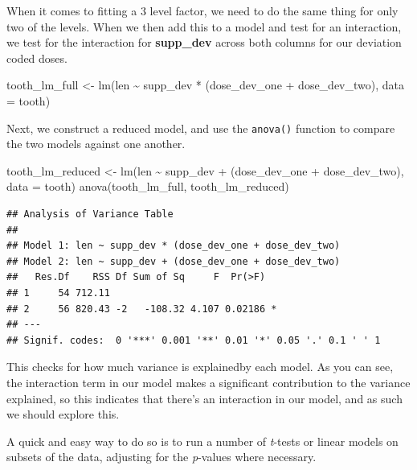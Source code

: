 \documentclass[
]{book}
\newenvironment{Shaded}{\begin{snugshade}}{\end{snugshade}}
\newcommand{\AttributeTok}[1]{\textcolor[rgb]{0.77,0.63,0.00}{#1}}
\newcommand{\FunctionTok}[1]{\textcolor[rgb]{0.00,0.00,0.00}{#1}}
\newcommand{\NormalTok}[1]{#1}
\newcommand{\OtherTok}[1]{\textcolor[rgb]{0.56,0.35,0.01}{#1}}
\newcommand{\SpecialCharTok}[1]{\textcolor[rgb]{0.00,0.00,0.00}{#1}}
\begin{document}
When it comes to fitting a 3 level factor, we need to do the same thing for only two of the levels. When we then add this to a model and test for an interaction, we test for the interaction for \textbf{supp\_dev} across both columns for our deviation coded doses.

\begin{Shaded}
\begin{Highlighting}[]
\NormalTok{tooth\_lm\_full }\OtherTok{\textless{}{-}} \FunctionTok{lm}\NormalTok{(len }\SpecialCharTok{\textasciitilde{}}\NormalTok{ supp\_dev }\SpecialCharTok{*}\NormalTok{ (dose\_dev\_one }\SpecialCharTok{+}\NormalTok{ dose\_dev\_two), }\AttributeTok{data =}\NormalTok{ tooth)}
\end{Highlighting}
\end{Shaded}

Next, we construct a reduced model, and use the \texttt{anova()} function to compare the two models against one another.

\begin{Shaded}
\begin{Highlighting}[]
\NormalTok{tooth\_lm\_reduced }\OtherTok{\textless{}{-}} \FunctionTok{lm}\NormalTok{(len }\SpecialCharTok{\textasciitilde{}}\NormalTok{ supp\_dev }\SpecialCharTok{+}\NormalTok{ (dose\_dev\_one }\SpecialCharTok{+}\NormalTok{ dose\_dev\_two), }\AttributeTok{data =}\NormalTok{ tooth)}
\FunctionTok{anova}\NormalTok{(tooth\_lm\_full, tooth\_lm\_reduced)}
\end{Highlighting}
\end{Shaded}

\begin{verbatim}
## Analysis of Variance Table
## 
## Model 1: len ~ supp_dev * (dose_dev_one + dose_dev_two)
## Model 2: len ~ supp_dev + (dose_dev_one + dose_dev_two)
##   Res.Df    RSS Df Sum of Sq     F  Pr(>F)  
## 1     54 712.11                             
## 2     56 820.43 -2   -108.32 4.107 0.02186 *
## ---
## Signif. codes:  0 '***' 0.001 '**' 0.01 '*' 0.05 '.' 0.1 ' ' 1
\end{verbatim}

This checks for how much variance is explainedby each model. As you can see, the interaction term in our model makes a significant contribution to the variance explained, so this indicates that there's an interaction in our model, and as such we should explore this.

A quick and easy way to do so is to run a number of \emph{t}-tests or linear models on subsets of the data, adjusting for the \emph{p}-values where necessary.
\end{document}
